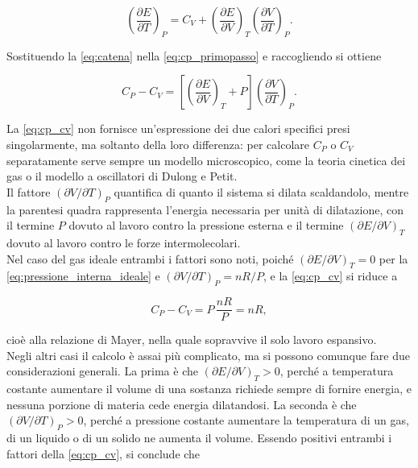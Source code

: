 \begin{equation}
    \left(\frac{\partial E}{\partial T}\right)_P = C_V + \left(\frac{\partial E}{\partial V}\right)_T\left(\frac{\partial V}{\partial T}\right)_P .
    \label{eq:catena}
\end{equation}

Sostituendo la \eqref{eq:catena} nella \eqref{eq:cp_primopasso} e raccogliendo si ottiene

\begin{equation}
    C_P - C_V = \left[\left(\frac{\partial E}{\partial V}\right)_T + P\right]\left(\frac{\partial V}{\partial T}\right)_P .
    \label{eq:cp_cv}
\end{equation}

La \eqref{eq:cp_cv} non fornisce un'espressione dei due calori specifici presi singolarmente, ma soltanto della loro differenza: per calcolare $C_P$ o $C_V$ separatamente serve sempre un modello microscopico, come la teoria cinetica dei gas o il modello a oscillatori di Dulong e Petit.\\

Il fattore $(\partial V/\partial T)_P$ quantifica di quanto il sistema si dilata scaldandolo, mentre la parentesi quadra rappresenta l'energia necessaria per unità di dilatazione, con il termine $P$ dovuto al lavoro contro la pressione esterna e il termine $(\partial E/\partial V)_T$ dovuto al lavoro contro le forze intermolecolari.\\

Nel caso del gas ideale entrambi i fattori sono noti, poiché $(\partial E/\partial V)_T = 0$ per la \eqref{eq:pressione_interna_ideale} e $(\partial V/\partial T)_P = nR/P$, e la \eqref{eq:cp_cv} si riduce a

\begin{equation}
    C_P - C_V = P\,\frac{nR}{P} = nR ,
    \label{eq:mayer}
\end{equation}

cioè alla relazione di Mayer, nella quale sopravvive il solo lavoro espansivo.\\

Negli altri casi il calcolo è assai più complicato, ma si possono comunque fare due considerazioni generali.
La prima è che $(\partial E/\partial V)_T > 0$, perché a temperatura costante aumentare il volume di una sostanza richiede sempre di fornire energia, e nessuna porzione di materia cede energia dilatandosi.
La seconda è che $(\partial V/\partial T)_P > 0$, perché a pressione costante aumentare la temperatura di un gas, di un liquido o di un solido ne aumenta il volume.
Essendo positivi entrambi i fattori della \eqref{eq:cp_cv}, si conclude che

